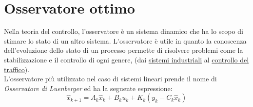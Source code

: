 \section{Osservatore ottimo}
Nella teoria del controllo, l'osservatore è un sistema dinamico che ha lo scopo di stimare lo stato di un altro sistema. L'osservatore è utile in quanto la conoscenza dell'evoluzione dello stato di un processo permette di risolvere problemi come la stabilizzazione e il controllo di ogni genere, (dai \href {https://www.researchgate.net/publication/260398837_Industrial_Applications_of_the_Kalman_Filter_A_Review}{sistemi industriali} al \href{https://www.researchgate.net/publication/221908836_Kalman_Filter_Applications_for_Traffic_Management}{controllo del traffico}).\\

L'osservatore più utilizzato nel caso di sistemi lineari prende il nome di \textit{Osservatore di Luenberger}\cite{bolzern} ed ha la seguente espressione:
\begin{equation}
\label{obsv}
\hat{x}_{k+1}=A_k\hat{x}_k+B_ku_k+K_k(y_k-C_k\hat{x}_k)
\end{equation}

